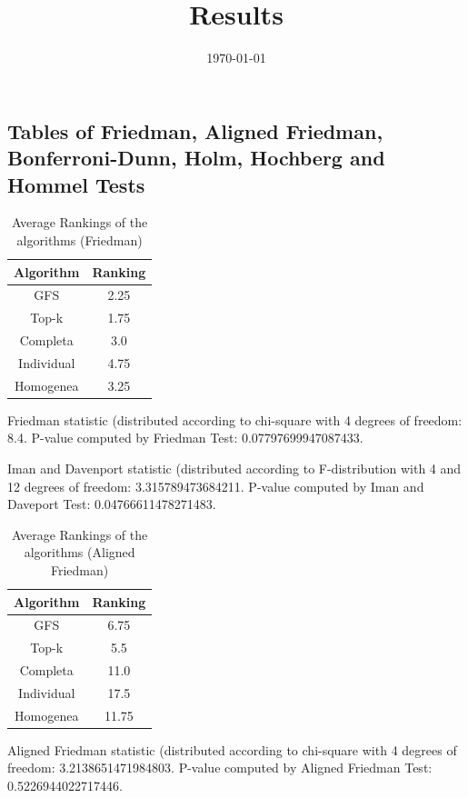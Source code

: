 \documentclass[a4paper,10pt]{article}
\title{Results}
\author{}
\date{\today}
\begin{document}
\begin{landscape}
\oddsidemargin 0in \topmargin 0in\maketitle
\section{Tables of Friedman, Aligned Friedman, Bonferroni-Dunn, Holm, Hochberg and Hommel Tests}
\begin{table}[!htp]
\centering
\caption{Average Rankings of the algorithms (Friedman)
}\begin{tabular}{c|c}
Algorithm&Ranking\\
\hline
GFS&2.25\\
Top-k&1.75\\
Completa&3.0\\
Individual&4.75\\
Homogenea&3.25\\
\end{tabular}
\end{table}


Friedman statistic (distributed according to chi-square with 4 degrees of freedom: 8.4. 
P-value computed by Friedman Test: 0.07797699947087433.\newline

Iman and Davenport statistic (distributed according to F-distribution with 4 and 12 degrees of freedom: 3.315789473684211. 
P-value computed by Iman and Daveport Test: 0.04766611478271483.\newline


\newpage

\begin{table}[!htp]
\centering
\caption{Average Rankings of the algorithms (Aligned Friedman)
}\begin{tabular}{c|c}
Algorithm&Ranking\\
\hline
GFS&6.75\\
Top-k&5.5\\
Completa&11.0\\
Individual&17.5\\
Homogenea&11.75\\
\end{tabular}
\end{table}


Aligned Friedman statistic (distributed according to chi-square with 4 degrees of freedom: 3.2138651471984803. 
P-value computed by Aligned Friedman Test: 0.5226944022717446.\newline



\end{landscape}
\end{document}
